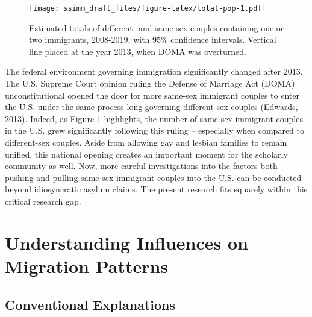 \documentclass[
  11pt,
]{article}
\begin{document}
\begin{figure}
\centering
\texttt{[image: ssimm\_draft\_files/figure-latex/total-pop-1.pdf]}
\caption{\label{fig:total-pop}Estimated totals of different- and same-sex couples containing one or two immigrants, 2008-2019, with 95\% confidence intervals. Vertical line placed at the year 2013, when DOMA was overturned.}
\end{figure}

The federal environment governing immigration significantly changed after 2013. The U.S. Supreme Court opinion ruling the Defense of Marriage Act (DOMA) unconstitutional opened the door for more same-sex immigrant couples to enter the U.S. under the same process long-governing different-sex couples (\protect\hyperlink{ref-edwards_2013}{Edwards, 2013}). Indeed, as Figure \ref{fig:total-pop} highlights, the number of same-sex immigrant couples in the U.S. grew significantly following this ruling -- especially when compared to different-sex couples. Aside from allowing gay and lesbian families to remain unified, this national opening creates an important moment for the scholarly community as well. Now, more careful investigations into the factors both pushing and pulling same-sex immigrant couples into the U.S. can be conducted beyond idiosyncratic asylum claims. The present research fits squarely within this critical research gap.

\hypertarget{understanding-influences-on-migration-patterns}{%
\section{Understanding Influences on Migration Patterns}\label{understanding-influences-on-migration-patterns}}

\hypertarget{conventional-explanations}{%
\subsection{Conventional Explanations}\label{conventional-explanations}}
\end{document}
